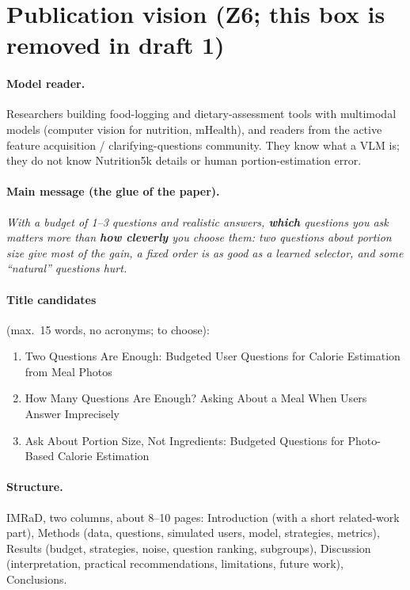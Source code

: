 \documentclass[twocolumn]{svjour3}
\begin{document}
\section*{Publication vision (Z6; this box is removed in draft 1)}
\label{sec:vision}

\paragraph{Model reader.}
Researchers building food-logging and dietary-assessment tools with multimodal models (computer vision
for nutrition, mHealth), and readers from the active feature acquisition / clarifying-questions community.
They know what a VLM is; they do not know Nutrition5k details or human portion-estimation error.

\paragraph{Main message (the glue of the paper).}
\emph{With a budget of 1--3 questions and realistic answers, \textbf{which} questions you ask matters
more than \textbf{how cleverly} you choose them: two questions about portion size give most of the
gain, a fixed order is as good as a learned selector, and some ``natural'' questions hurt.}

\paragraph{Title candidates} (max.\ 15 words, no acronyms; to choose):
\begin{enumerate}
  \item Two Questions Are Enough: Budgeted User Questions for Calorie Estimation from Meal Photos
  \item How Many Questions Are Enough? Asking About a Meal When Users Answer Imprecisely
  \item Ask About Portion Size, Not Ingredients: Budgeted Questions for Photo-Based Calorie Estimation
\end{enumerate}

\paragraph{Structure.} IMRaD, two columns, about 8--10 pages: Introduction (with a short related-work
part), Methods (data, questions, simulated users, model, strategies, metrics), Results (budget, strategies,
noise, question ranking, subgroups), Discussion (interpretation, practical recommendations, limitations,
future work), Conclusions.
\end{document}
